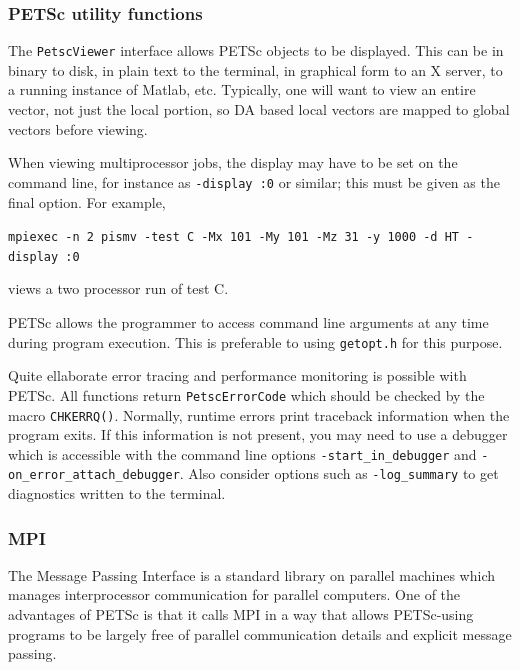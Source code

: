 \documentclass[12pt,final]{amsart}
\renewcommand{\t}[1]{\texttt{#1}}
\begin{document}
\subsubsection{PETSc utility functions}
The \t{PetscViewer} interface allows PETSc objects to be displayed. This can be in binary
to disk, in plain text to the terminal, in graphical form to an X server, to a running
instance of Matlab, etc. Typically, one will want to view an entire vector, not just the
local portion, so DA based local vectors are mapped to global vectors before viewing.

When viewing multiprocessor jobs, the display may have to be set on the command line, for instance as
\t{-display :0} or similar; this must be given as the final option.  For example,

\verb|mpiexec -n 2 pismv -test C -Mx 101 -My 101 -Mz 31 -y 1000 -d HT -display :0|

\noindent views a two processor run of test C.

PETSc allows the programmer to access command line arguments at any time during program
execution. This is preferable to using \t{getopt.h} for this purpose.

Quite ellaborate error tracing and performance monitoring is possible with PETSc.  All
functions return \t{PetscErrorCode} which should be checked by the macro \t{CHKERRQ()}.
Normally, runtime errors print traceback information when the program exits.  If this
information is not present, you may need to use a debugger which is accessible with the
command line options \verb|-start_in_debugger| and \verb|-on_error_attach_debugger|.  Also
consider options such as \verb|-log_summary| to get diagnostics written to the terminal.

\subsubsection{MPI}  The Message Passing Interface is a standard library on parallel machines which manages interprocessor communication for parallel computers.  One of the advantages of PETSc is that it calls MPI in a way that allows PETSc-using programs to be largely free of parallel communication details and explicit message passing.


\clearpage\newpage



\end{document}
